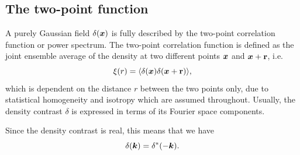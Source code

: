 \subsection{The two-point function}

A purely Gaussian field $\delta(\bm {x})$ is fully described by the two-point correlation function or power spectrum. The two-point correlation function is defined as the joint ensemble average of the density at two different points $\bm {x}$ and $\bm {x} + \textbf{r}$, i.e. 
\begin{equation}
	\xi(r) = \langle \delta(\bm {x}) \delta(\bm {x} + \textbf{r}) \rangle,
\end{equation}
which is dependent on the distance $r$ between the two points only, due to statistical homogeneity and isotropy which are assumed throughout. Usually, the density contrast $\delta$ is expressed in terms of its Fourier space components.

Since the density contrast is real, this means that we have
\begin{equation}
	\delta(\bm {k}) = \delta^*(-\bm {k}).
\end{equation}

